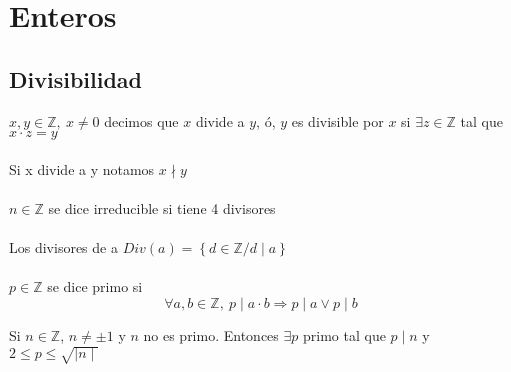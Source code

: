 \documentclass[a4paper,10pt]{article}
\begin{document}
\section{Enteros}




\subsection{Divisibilidad}


 $x,y \in \mathbb{Z},\ x \not=0$ decimos que $x$ divide a $y$, ó, $y$ es divisible por $x$ si $\exists z \in \mathbb{Z}$ tal que $x \cdot z = y$  \\ \\

\notacion Si x divide a y notamos $x \nmid y$ \\ \\

 $n \in \mathbb{Z}$ se dice irreducible si tiene 4 divisores \\ \\ 

 Los divisores de a $Div(a) = \left\{d \in \mathbb{Z} / d \mid a \right\}$ \\ \\

 $p \in \mathbb{Z}$ se dice primo si
\begin{equation}
    \forall a,b \in \mathbb{Z}, \ p \mid {a \cdot b} \Rightarrow p \mid a \vee  p \mid b 
\end{equation}

\propiedad Si $n \in \mathbb{Z}$, $n \not = \pm 1$ y $n$ no es primo. Entonces $\exists p$ primo tal que $p \mid n$ y $2 \leq p \leq \sqrt {\mid n \mid}$ \\ \\
\end{document}
